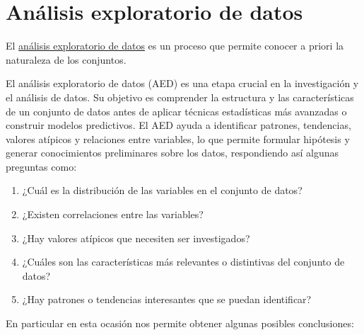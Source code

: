 \section{Análisis exploratorio de datos}

El \href{https://www.ibm.com/es-es/cloud/learn/exploratory-data-analysis}{análisis exploratorio de datos} es un proceso que permite conocer a priori la naturaleza de los conjuntos.

El análisis exploratorio de datos (AED) es una etapa crucial en la investigación y el análisis de datos. Su objetivo es comprender la estructura y las características de un conjunto de datos antes de aplicar técnicas estadísticas más avanzadas o construir modelos predictivos. El AED ayuda a identificar patrones, tendencias, valores atípicos y relaciones entre variables, lo que permite formular hipótesis y generar conocimientos preliminares sobre los datos, respondiendo así algunas preguntas como: 

\begin{enumerate}
    \item ¿Cuál es la distribución de las variables en el conjunto de datos?
    \item ¿Existen correlaciones entre las variables?
    \item ¿Hay valores atípicos que necesiten ser investigados?
    \item ¿Cuáles son las características más relevantes o distintivas del conjunto de datos?
    \item ¿Hay patrones o tendencias interesantes que se puedan identificar?
\end{enumerate}

En particular en esta ocasión nos permite obtener algunas posibles conclusiones:

